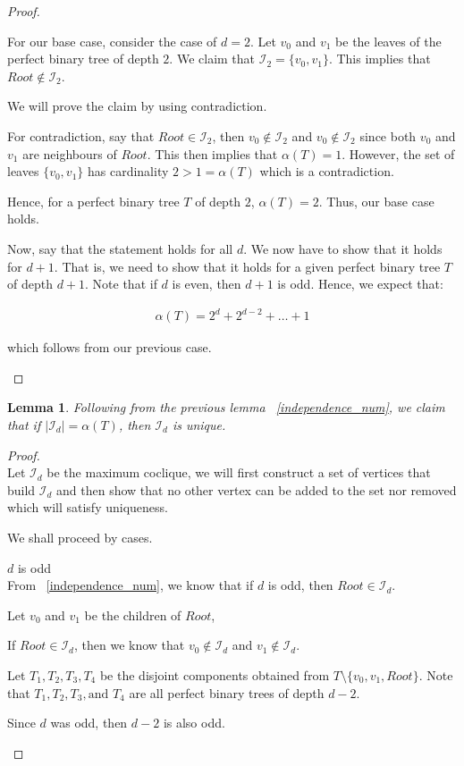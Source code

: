 \documentclass{amsart}
\newtheorem{lemma}[theorem]{Lemma}
\theoremstyle{definition}
\begin{document}
\begin{proof}
\begin{caseof}
		For our base case, consider the case of $d = 2$. Let $v_0$ and $v_1$ be the leaves of the perfect binary tree of depth $2$. We claim that $\mathcal{I}_2 = \{v_0, v_1\}$. This implies that $Root \not\in \mathcal{I}_2$. 

		We will prove the claim by using contradiction.	

		For contradiction, say that $Root \in \mathcal{I}_2$, then $v_0 \not\in \mathcal{I}_2$ and $v_0 \not\in \mathcal{I}_2$ since both $v_0$ and $v_1$ are neighbours of $Root$. This then implies that $\alpha(T) = 1$. However, the set of leaves $\{v_0, v_1\}$ has cardinality $2 > 1 = \alpha(T)$ which is a contradiction.

		Hence, for a perfect binary tree $T$ of depth $2$, $\alpha(T) = 2$. Thus, our base case holds.


		Now, say that the statement holds for all $d$. We now have to show that it holds for $d+1$. That is, we need to show that it holds for a given perfect binary tree $T$ of depth $d + 1$. Note that if $d$ is even, then $d + 1$ is odd. Hence, we expect that:

		\begin{align*}
			\alpha(T) = 2^d + 2^{d - 2} + \ldots + 1
		\end{align*}

		which follows from our previous case.
	\end{caseof}
\end{proof}

\begin{lemma}
Following from the previous lemma ~\ref{independence_num}, we claim that if $|\mathcal{I}_d| = \alpha(T)$, then $\mathcal{I}_d$ is unique.
\end{lemma}
\begin{proof}
	$ $ \\
	Let $\mathcal{I}_d$ be the maximum coclique, we will first construct a set of vertices that build $\mathcal{I}_d$ and then show that no other vertex can be added to the set nor removed which will satisfy uniqueness.

	We shall proceed by cases.
	\begin{caseof}
	\item $d$ is odd \\
		From ~\ref{independence_num}, we know that if $d$ is odd, then $Root \in \mathcal{I}_d$. 

		Let $v_0$ and $v_1$ be the children of $Root$, 

		If $Root \in \mathcal{I}_d$, then we know that $v_0 \not\in \mathcal{I}_d$ and $v_1 \not\in \mathcal{I}_d$.

		Let $T_1, T_2, T_3, T_4$ be the disjoint components obtained from $T\setminus\{v_0, v_1, Root\}$. Note that $T_1, T_2, T_3, \text{and } T_4$ are all perfect binary trees of depth $d - 2$.

		Since $d$ was odd, then $d - 2$ is also odd.
	\end{caseof}
\end{proof}
\end{document}
